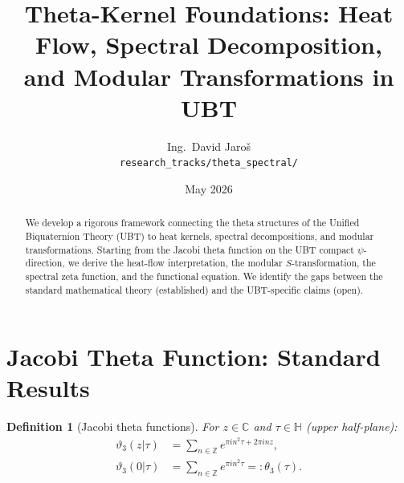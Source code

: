 \documentclass[11pt,a4paper]{article}
\title{Theta-Kernel Foundations: Heat Flow, Spectral Decomposition,\\
and Modular Transformations in UBT}
\author{Ing.\ David Jaro\v{s}\\
\small \texttt{research\_tracks/theta\_spectral/}}
\date{May 2026}
\newtheorem{definition}{Definition}
\begin{document}
\maketitle

\begin{center}
\end{center}

\begin{abstract}
We develop a rigorous framework connecting the theta structures of the Unified
Biquaternion Theory (UBT) to heat kernels, spectral decompositions, and modular
transformations.  Starting from the Jacobi theta function on the UBT compact
$\psi$-direction, we derive the heat-flow interpretation, the modular $S$-transformation,
the spectral zeta function, and the functional equation.  We identify the gaps
between the standard mathematical theory (established) and the UBT-specific
claims (open).
\end{abstract}

\tableofcontents

\section{Jacobi Theta Function: Standard Results}

\begin{definition}[Jacobi theta functions]
  \label{def:theta}
  For $z \in \mathbb{C}$ and $\tau \in \mathbb{H}$ (upper half-plane):
  \begin{align*}
    \vartheta_3(z|\tau) &= \sum_{n\in\mathbb{Z}} e^{\pi i n^2\tau + 2\pi i nz}, \\
    \vartheta_3(0|\tau) &= \sum_{n\in\mathbb{Z}} e^{\pi i n^2\tau}
    =: \theta_3(\tau).
  \end{align*}
\end{definition}
\end{document}
